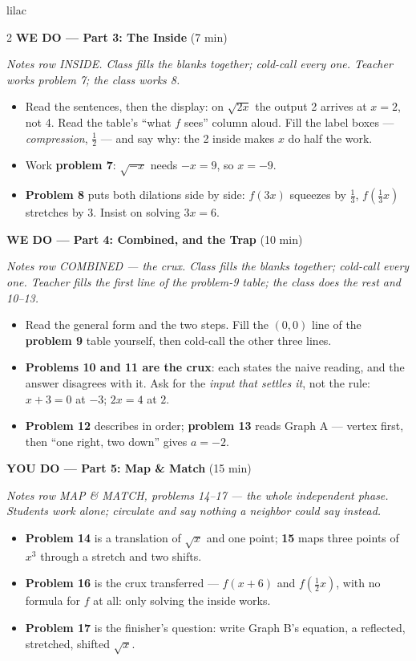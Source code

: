 \documentclass[10pt]{article}
\begin{document}
\begin{skillbox}{lilac}
\begin{multicols}{2}
\textbf{WE DO --- Part 3: The Inside} (7 min)

\textit{Notes row INSIDE. Class fills the blanks together; cold-call every one. Teacher works
problem 7; the class works 8.}
\begin{itemize}
  \item Read the sentences, then the display: on $\sqrt{2x}$ the output 2 arrives at $x = 2$,
        not 4. Read the table's ``what $f$ sees'' column aloud. Fill the label boxes ---
        \emph{compression}, $\tfrac{1}{2}$ --- and say why: the 2 inside makes $x$ do half the
        work.
  \item Work \textbf{problem 7}: $\sqrt{-x}$ needs $-x = 9$, so $x = -9$.
  \item \textbf{Problem 8} puts both dilations side by side: $f(3x)$ squeezes by
        $\tfrac{1}{3}$, $f(\tfrac{1}{3}x)$ stretches by 3. Insist on solving $3x = 6$.
\end{itemize}

\textbf{WE DO --- Part 4: Combined, and the Trap} (10 min)

\textit{Notes row COMBINED --- the crux. Class fills the blanks together; cold-call every one.
Teacher fills the first line of the problem-9 table; the class does the rest and 10--13.}
\begin{itemize}
  \item Read the general form and the two steps. Fill the $(0, 0)$ line of the
        \textbf{problem 9} table yourself, then cold-call the other three lines.
  \item \textbf{Problems 10 and 11 are the crux}: each states the naive reading, and the
        answer disagrees with it. Ask for the \emph{input that settles it}, not the rule:
        $x + 3 = 0$ at $-3$; $2x = 4$ at $2$.
  \item \textbf{Problem 12} describes in order; \textbf{problem 13} reads Graph A ---
        vertex first, then ``one right, two down'' gives $a = -2$.
\end{itemize}

\textbf{YOU DO --- Part 5: Map \& Match} (15 min)

\textit{Notes row MAP \& MATCH, problems 14--17 --- the whole independent phase. Students work
alone; circulate and say nothing a neighbor could say instead.}
\begin{itemize}
  \item \textbf{Problem 14} is a translation of $\sqrt{x}$ and one point; \textbf{15} maps three
        points of $x^3$ through a stretch and two shifts.
  \item \textbf{Problem 16} is the crux transferred --- $f(x + 6)$ and $f(\tfrac{1}{2}x)$, with
        no formula for $f$ at all: only solving the inside works.
  \item \textbf{Problem 17} is the finisher's question: write Graph B's equation, a reflected,
        stretched, shifted $\sqrt{x}$.
\end{itemize}
\end{multicols}
\end{skillbox}
\end{document}
